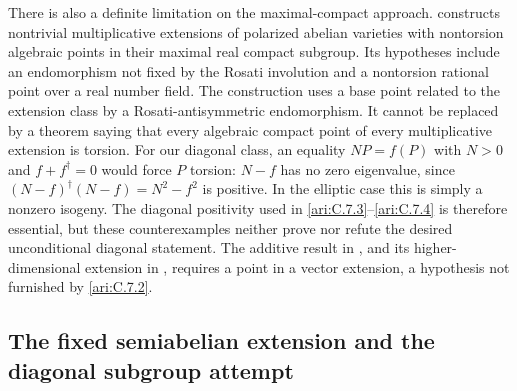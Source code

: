 There is also a definite limitation on the maximal-compact
approach. \citet[Theorem 2.1]{bertrand1995} constructs
nontrivial multiplicative extensions of polarized abelian
varieties with nontorsion algebraic points in their maximal
real compact subgroup. Its hypotheses include an endomorphism
not fixed by the Rosati involution and a nontorsion rational
point over a real number field. The construction uses a base
point related to the extension class by a Rosati-antisymmetric
endomorphism. It cannot be replaced by a theorem saying that
every algebraic compact point of every multiplicative
extension is torsion. For our diagonal class, an equality
$NP=f(P)$ with $N>0$ and $f+f^\dagger=0$ would force
$P$ torsion: $N-f$ has no zero eigenvalue, since
$(N-f)^\dagger(N-f)=N^2-f^2$ is positive. In the elliptic
case this is simply a nonzero isogeny. The diagonal positivity
used in \ref{ari:C.7.3}--\ref{ari:C.7.4} is therefore essential, but these
counterexamples neither prove nor refute the desired
unconditional diagonal statement. The additive result in
\citet[Theorem 3.1]{bertrand1995}, and its higher-dimensional
extension in \citet{bost2009}, requires a point in a vector
extension, a hypothesis not furnished by \ref{ari:C.7.2}.


\subsection{The fixed semiabelian extension and the diagonal subgroup attempt}

